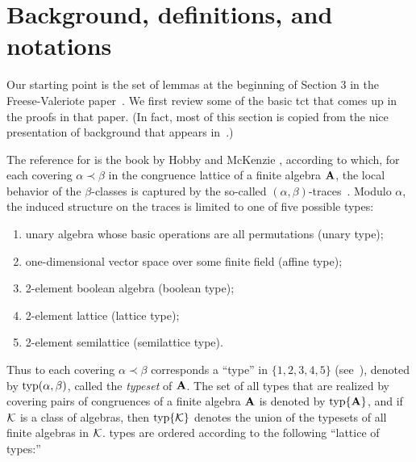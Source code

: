 \section{Background, definitions, and notations}
\label{sec:defin-notat}
Our starting point is the set of lemmas at the beginning of Section 3 in
the Freese-Valeriote paper~\cite{Freese:2009}.
We first review some of the basic \ac{tct}
that comes up in the proofs in that paper. (In fact, most of this section 
is copied from the nice presentation of \tct background that appears
in~\cite[Sec.~2]{Freese:2009}.)

The reference for \tct is the book by Hobby and McKenzie
\cite{HM:1988}, according to which,
for each covering $\alpha \prec \beta$ in the congruence lattice of a finite
algebra $\mathbf{A}$, the local behavior of the $\beta$-classes is captured by the
so-called $(\alpha, \beta)$-traces~\cite[Def.~2.15]{HM:1988}.
Modulo $\alpha$, the induced structure on the traces is limited to one
of five possible types:

\begin{enumerate}[(1)]
\item unary algebra whose basic operations are all permutations (unary type);
\item one-dimensional vector space over some finite field (affine type);
\item 2-element boolean algebra (boolean type);
\item 2-element lattice (lattice type);
\item 2-element semilattice (semilattice type).
\end{enumerate}

Thus to each covering $\alpha \prec \beta$
corresponds a ``\tct type'' in $\{1,2,3,4,5\}$ (see~\cite[Def.~5.1]{HM:1988}),
denoted by $\operatorname{typ}(\alpha, \beta)$, called the \emph{typeset} of $\mathbf{A}$.
The set of all \tct types that are realized by covering pairs of congruences of a
finite algebra $\mathbf{A}$ is denoted by $\operatorname{typ}\{\mathbf{A}\}$, and if $\mathcal{K}$ is a class of algebras,
then $\operatorname{typ}\{\mathcal{K}\}$ denotes the union of the typesets of all finite algebras in $\mathcal{K}$.
\tct types are ordered according to the following ``lattice of types:''

